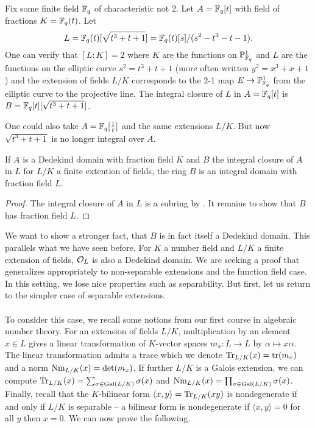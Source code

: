 \begin{example}
  Fix some finite field $\mathbb{F}_{q}$ of characteristic not 2. Let $A=\mathbb{F}_{q}[t]$ with field of fractions $K=\mathbb{F}_{q}(t)$. Let 
  $$L=\mathbb{F}_{q}(t)[\sqrt{t^{3}+t+1}]=\mathbb{F}_{q}(t)[s]/(s^{2}-t^{3}-t-1).$$
  One can verify that $[L:K]=2$ where $K$ are the functions on $\mathbb{P}^{1}_{\mathbb{F}_{q}}$ and $L$ are the functions on the elliptic curve $s^{2}=t^{3}+t+1$ (more often written $y^{2}=x^{3}+x+1$) and the extension of fields $L/K$ corresponds to the 2-1 map $E\to\mathbb{P}^{1}_{\mathbb{F}_{q}}$ from the elliptic curve to the projective line. The integral closure of $L$ in $A=\mathbb{F}_{q}[t]$ is $B=\mathbb{F}_{q}[t][\sqrt{t^{3}+t+1}]$. 
\end{example}
\begin{remark}
  One could also take $A=\mathbb{F}_{q}[\frac{1}{t}]$ and the same extensions $L/K$. But now $\sqrt{t^{3}+t+1}$ is no longer integral over $A$. 
\end{remark}
\begin{proposition}
  If $A$ is a Dedekind domain with fraction field $K$ and $B$ the integral closure of $A$ in $L$ for $L/K$ a finite extention of fields, the ring $B$ is an integral domain with fraction field $L$. 
\end{proposition}
\begin{proof}
  The integral closure of $A$ in $L$ is a subring by . It remains to show that $B$ has fraction field $L$. 
\end{proof}
We want to show a stronger fact, that $B$ is in fact itself a Dedekind domain. This parallels what we have seen before. For $K$ a number field and $L/K$ a finite extension of fields, $\mathcal{O}_{L}$ is also a Dedekind domain. We are seeking a proof that generalizes appropriately to non-separable extensions and the function field case. In this setting, we lose nice properties such as separability. But first, let us return to the simpler case of separable extensions. 
\\\\
To consider this case, we recall some notions from our first course in algebraic number theory. For an extension of fields $L/K$, multiplication by an element $x\in L$ gives a linear transformation of $K$-vector spaces $m_{x}:L\to L$ by $\alpha\mapsto x\alpha$. The linear transformation admits a trace which we denote $\mathrm{Tr}_{L/K}(x)=\mathrm{tr}(m_{x})$ and a norm $\mathrm{Nm}_{L/K}(x)=\det(m_{x})$. If further $L/K$ is a Galois extension, we can compute $\mathrm{Tr}_{L/K}(x)=\sum_{\sigma\in\mathrm{Gal}(L/K)}\sigma(x)$ and $\mathrm{Nm}_{L/K}(x)=\prod_{\sigma\in\mathrm{Gal}(L/K)}\sigma(x)$. Finally, recall that the $K$-bilinear form $\langle x,y\rangle=\mathrm{Tr}_{L/K}(xy)$ is nondegenerate if and only if $L/K$ is separable -- a bilinear form is nondegenerate if $\langle x,y\rangle=0$ for all $y$ then $x=0$. We can now prove the following. 
